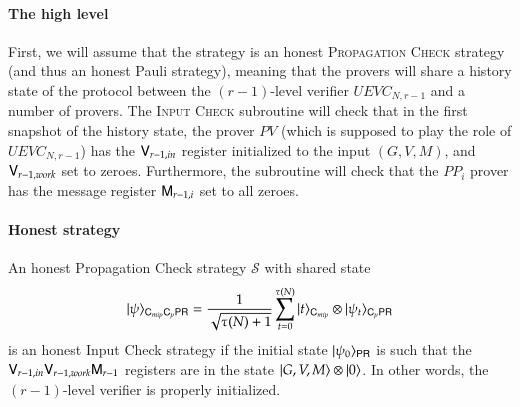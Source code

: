\paragraph{The high level} First, we will assume that the strategy is an honest \textsc{Propagation Check} strategy (and thus an honest Pauli strategy), meaning that the provers will share a history state of the protocol between the $(r-1)$-level verifier $UEVC_{N,r-1}$ and a number of provers. The \textsc{Input Check} subroutine will check that in the first snapshot of the history state, the prover $PV$ (which is supposed to play the role of $UEVC_{N,r-1}$) has the ${\mathsf{V}}_{r-1,in}$ register initialized to the input $(G,V,M)$, and ${\mathsf{V}}_{r-1,work} $ set to zeroes. Furthermore, the subroutine will check that the $PP_i$ prover has the message register ${\mathsf{M}}_{r-1,i}$ set to all zeroes.

\paragraph{Honest strategy}
An honest Propagation Check strategy $\mathcal{S}$ with shared state
\[
	|\psi\rangle_{{\mathsf{C}}_{mip} {\mathsf{C}}_p {\mathsf{P}} {\mathsf{R}}} = \frac{1}{\sqrt{\tau(N) + 1}} \sum_{t = 0}^{\tau(N)} |t\rangle_{{\mathsf{C}}_{mip}} \otimes |\psi_t\rangle_{{\mathsf{C}}_p {\mathsf{P}} {\mathsf{R}}}
\]
is an honest Input Check strategy if the initial state $|\psi_0\rangle_{{\mathsf{P}} {\mathsf{R}}}$ is such that the ${\mathsf{V}}_{r-1,in}{\mathsf{V}}_{r-1,work} {\mathsf{M}}_{r-1}$ registers are in the state $|G,V,M\rangle \otimes |0\rangle$. In other words, the $(r-1)$-level verifier is properly initialized.




